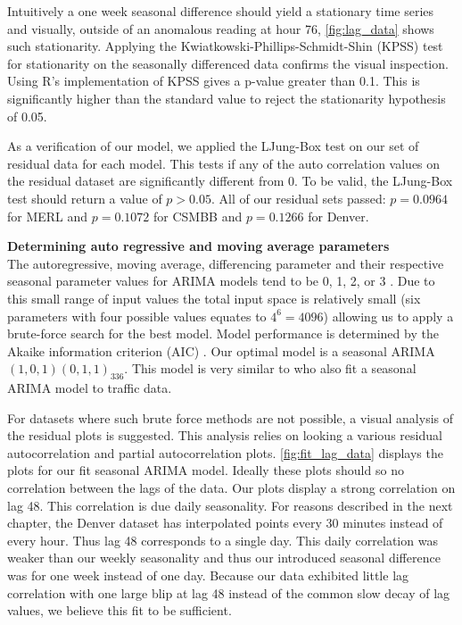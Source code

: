 Intuitively a one week seasonal difference should yield a stationary time series and visually, outside of an anomalous reading at hour 76, \ref{fig:lag_data} shows such stationarity.  Applying the Kwiatkowski-Phillips-Schmidt-Shin (KPSS) \cite{Kwiatkowski1992} test for stationarity on the seasonally differenced data confirms the visual inspection.  Using R's implementation of KPSS gives a p-value greater than 0.1.  This is significantly higher than the standard value to reject the stationarity hypothesis of 0.05.  

As a verification of our model, we applied the LJung-Box test \cite{Ljung1978} on our set of residual data for each model.  This tests if any of the auto correlation values on the residual dataset are significantly different from 0.  To be valid, the LJung-Box test should return a value of $p > 0.05$.  All of our residual sets passed: $p = 0.0964$ for MERL and $p = 0.1072$ for CSMBB and $p = 0.1266$ for Denver.  

\bigskip
\noindent \textbf{Determining auto regressive and moving average parameters} \\
The autoregressive, moving average, differencing parameter and their respective seasonal parameter values for ARIMA models tend to be 0, 1, 2, or 3 \cite{Box2008}.  Due to this small range of input values the total input space is relatively small (six parameters with four possible values equates to $4^6 = 4096$) allowing us to apply a brute-force search for the best model.  Model performance is determined by the Akaike information criterion (AIC) \cite{Akaike1974}.  Our optimal model is a seasonal ARIMA $(1,0,1)(0,1,1)_{336}$.  This model is very similar to \cite{Williams2003} who also fit a seasonal ARIMA model to traffic data.

For datasets where such brute force methods are not possible, a visual analysis of the residual plots is suggested.  This analysis relies on looking a various residual autocorrelation and partial autocorrelation plots.  \ref{fig:fit_lag_data} displays the plots for our fit seasonal ARIMA model.  Ideally these plots should so no correlation between the lags of the data.  Our plots display a strong correlation on lag 48.  This correlation is due daily seasonality.  For reasons described in the next chapter, the Denver dataset has interpolated points every 30 minutes instead of every hour.  Thus lag 48 corresponds to a single day.  This daily correlation was weaker than our weekly seasonality and thus our introduced seasonal difference was for one week instead of one day.  Because our data exhibited little lag correlation with one large blip at lag 48 instead of the common slow decay of lag values, we believe this fit to be sufficient.  

